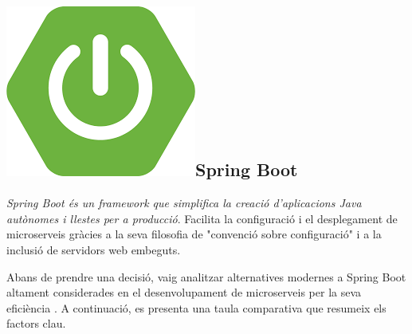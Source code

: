\newcommand{\springlogo}{\includegraphics[height=8ex]{Figures/logos/springboot.png}}

\subsection{\springlogo\hspace{0.5em}Spring Boot}
\textit{Spring Boot és un framework que simplifica la creació d'aplicacions Java autònomes i llestes per a producció}. Facilita la configuració i el desplegament de microserveis gràcies a la seva filosofia de "convenció sobre configuració" i a la inclusió de servidors web embeguts. 

Abans de prendre una decisió, vaig analitzar alternatives modernes a Spring Boot altament considerades en el desenvolupament de microserveis per la seva eficiència \cite{baeldung-spring-alternatives}. A continuació, es presenta una taula comparativa que resumeix els factors clau.

